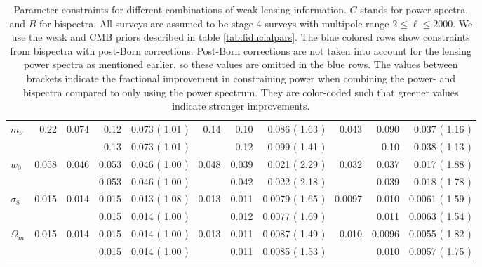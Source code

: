 \documentclass[11pt]{article} %
\newcommand{\greenfactor}[1]{%
    \pgfmathsetmacro{\value}{min(100,round(100*(#1-1)))}%
    \textcolor{green!80!black!\value!black}{#1}%
}
\begin{document}
\begin{table}
\begin{tabular}{|l|r|rrr|rrr|rrr|}
        \hline
$m_\nu$    & 0.22 & 0.074 & 0.12 & 0.073 (\greenfactor{1.01}) & 0.14 & 0.10 & 0.086 (\greenfactor{1.63}) & 0.043 & 0.090 & 0.037 (\greenfactor{1.16}) \\
\rowcolor{blue!10}
           &      & & 0.13 & 0.073 (\greenfactor{1.01}) & & 0.12 & 0.099 (\greenfactor{1.41}) & & 0.10 & 0.038 (\greenfactor{1.13}) \\
$w_0$      & 0.058 & 0.046 & 0.053 & 0.046 (\greenfactor{1.00}) & 0.048 & 0.039 & 0.021 (\greenfactor{2.29}) & 0.032 & 0.037 & 0.017 (\greenfactor{1.88}) \\
\rowcolor{blue!10}
           &       & & 0.053 & 0.046 (\greenfactor{1.00}) & & 0.042 & 0.022 (\greenfactor{2.18}) &  & 0.039 & 0.018 (\greenfactor{1.78}) \\
$\sigma_8$ & 0.015 & 0.014 & 0.015 & 0.013 (\greenfactor{1.08}) & 0.013 & 0.011 & 0.0079 (\greenfactor{1.65}) & 0.0097 & 0.010 & 0.0061 (\greenfactor{1.59}) \\
\rowcolor{blue!10}
           &       & & 0.015 & 0.014 (\greenfactor{1.00}) &  & 0.012 & 0.0077 (\greenfactor{1.69}) & & 0.011 & 0.0063 (\greenfactor{1.54}) \\
$\Omega_m$ & 0.015 & 0.014 & 0.015 & 0.014 (\greenfactor{1.00}) & 0.013 & 0.011 & 0.0087 (\greenfactor{1.49}) & 0.010 & 0.0096 & 0.0055 (\greenfactor{1.82}) \\
\rowcolor{blue!10}
           &       & & 0.015 & 0.014 (\greenfactor{1.00}) & & 0.011 & 0.0085 (\greenfactor{1.53}) & & 0.010 & 0.0057 (\greenfactor{1.75}) \\
        \hline
    \end{tabular}

\caption{Parameter constraints for different combinations of weak lensing information. $C$ stands for power spectra, and $B$ for bispectra. All surveys are assumed to be stage 4 surveys with multipole range $2 \leq \ell \leq 2000$. We use the weak and CMB priors described in table \ref{tab:fiducialpars}. The blue colored rows show constraints from bispectra with post-Born corrections. Post-Born corrections are not taken into account for the lensing power spectra as mentioned earlier, so these values are omitted in the blue rows. The values between brackets indicate the fractional improvement in constraining power when combining the power- and bispectra compared to only using the power spectrum. They are color-coded such that greener values indicate stronger improvements.}
\label{tab:paramconstraintstight}
\end{table}
\end{document}
